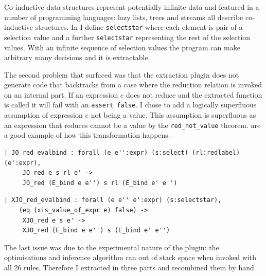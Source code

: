 \documentclass[12pt,twoside,notitlepage]{report}
\begin{document}
Co-inductive data structures represent potentially infinite data and featured in a number of programming languages: lazy lists, trees and streams all describe co-inductive structures. In  I define \verb|selectstar| where each element is pair of a selection value and a further \verb|selectstar| representing the rest of the selection values.  With an infinite sequence of selection values the program can make arbitrary many decisions and it is extractable.

The second problem that surfaced was that the extraction plugin does not generate code that backtracks from a case where the reduction relation is invoked on an internal part. If an expression $ e $ does not reduce and the extracted function is called it will fail with an \lstinline|assert false|. I chose to add a logically superfluous assumption of expression $ e $ not being a value. This assumption is superfluous as an expression that reduces cannot be a value by the \verb|red_not_value| theorem.   are a good example of how this transformation happens. \vspace{4mm}

\begin{minipage}{0.9\linewidth}
\begin{lstlisting}[language={Coq},caption={Coq reduction clause with unsafe assumption}, label={lst:coqredunsafe}]
| JO_red_evalbind : forall (e e'':expr) (s:select) (rl:redlabel) (e':expr),
     JO_red e s rl e' ->
     JO_red (E_bind e e'') s rl (E_bind e' e'')
\end{lstlisting}
\end{minipage}

\begin{minipage}{\linewidth}
\begin{lstlisting}[language={Coq},caption={Coq extractable reduction clause with safe assumption}, label={lst:coqxredsafe}]
 | XJO_red_evalbind : forall (e e'' e':expr) (s:selectstar),
    (eq (xis_value_of_expr e) false) ->
     XJO_red e s e' ->
     XJO_red (E_bind e e'') s (E_bind e' e'')
\end{lstlisting}
\end{minipage}


The last issue was due to the experimental nature of the plugin: the optimisations and inference algorithm ran out of stack space when invoked with all 26 rules. Therefore I extracted in three parts and recombined them by hand.
\end{document}
